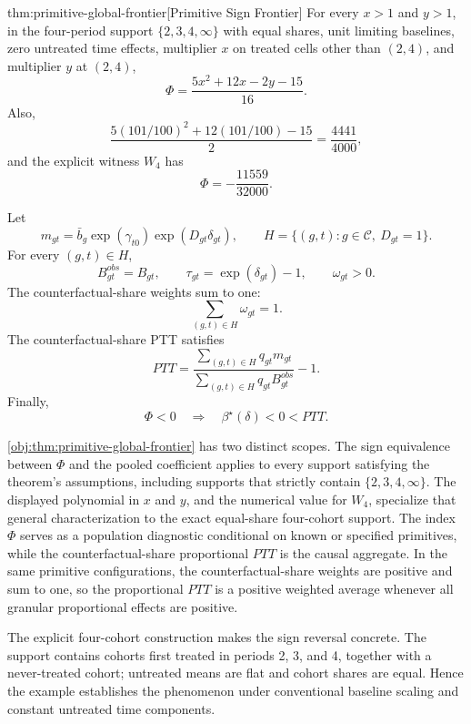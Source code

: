 \documentclass[11pt]{article}
\begin{document}
\begin{theoremv}{thm:primitive-global-frontier}[Primitive Sign Frontier]
For every \(x>1\) and \(y>1\), in the four-period support \(\{2,3,4,\infty\}\) with equal shares, unit limiting baselines, zero untreated time effects, multiplier \(x\) on treated cells other than \((2,4)\), and multiplier \(y\) at \((2,4)\),
\[
\Phi=\frac{5x^2+12x-2y-15}{16}.
\]
Also,
\[
\frac{5(101/100)^2+12(101/100)-15}{2}=\frac{4441}{4000},
\]
and the explicit witness \(W_4\) has
\[
\Phi=-\frac{11559}{32000}.
\]

Let
\[
m_{gt}=\bar b_g\exp(\gamma_{t0})\exp(D_{gt}\delta_{gt}),
\qquad
H=\{(g,t):g\in\mathcal C,\ D_{gt}=1\}.
\]
For every \((g,t)\in H\),
\[
B^{obs}_{gt}=B_{gt},\qquad
\tau_{gt}=\exp(\delta_{gt})-1,\qquad
\omega_{gt}>0.
\]
The counterfactual-share weights sum to one:
\[
\sum_{(g,t)\in H}\omega_{gt}=1.
\]
The counterfactual-share PTT satisfies
\[
PTT
=
\frac{\sum_{(g,t)\in H} q_{gt}m_{gt}}
{\sum_{(g,t)\in H} q_{gt}B^{obs}_{gt}}
-1.
\]
Finally,
\[
\Phi<0
\quad\Longrightarrow\quad
\beta^\star(\delta)<0<PTT .
\]
\end{theoremv}

\cref{obj:thm:primitive-global-frontier} has two distinct scopes. The sign equivalence between \(\Phi\) and the pooled coefficient applies to every support satisfying the theorem's assumptions, including supports that strictly contain \(\{2,3,4,\infty\}\). The displayed polynomial in \(x\) and \(y\), and the numerical value for \(W_4\), specialize that general characterization to the exact equal-share four-cohort support. The index \(\Phi\) serves as a population diagnostic conditional on known or specified primitives, while the counterfactual-share proportional \(PTT\) is the causal aggregate. In the same primitive configurations, the counterfactual-share weights are positive and sum to one, so the proportional \(PTT\) is a positive weighted average whenever all granular proportional effects are positive.

The explicit four-cohort construction makes the sign reversal concrete. The support contains cohorts first treated in periods 2, 3, and 4, together with a never-treated cohort; untreated means are flat and cohort shares are equal. Hence the example establishes the phenomenon under conventional baseline scaling and constant untreated time components.
\end{document}
